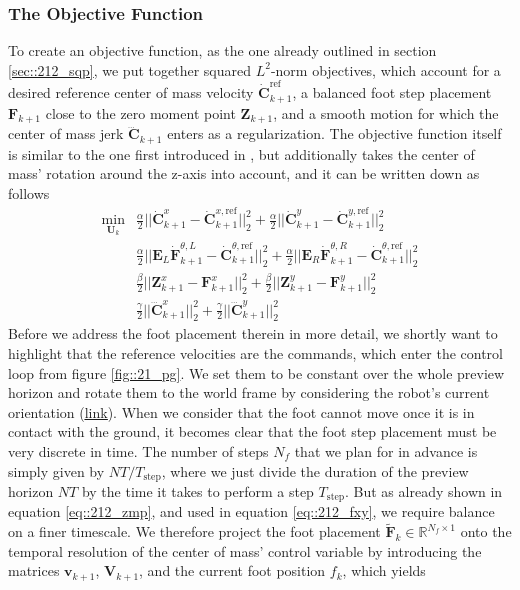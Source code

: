 \subsubsection{The Objective Function}
To create an objective function, as the one already outlined in section \ref{sec::212_sqp}, we put together squared $L^2$-norm objectives, which account for a desired reference center of mass velocity $\dot{\bm{C}}_{k+1}^\text{ref}$, a balanced foot step placement $\textbf{F}_{k+1}$ close to the zero moment point $\bm{Z}_{k+1}$, and a smooth motion for which the center of mass jerk $\dddot{\bm{C}}_{k+1}$ enters as a regularization. The objective function itself is similar to the one first introduced in \cite{herdt2010online}, but additionally takes the center of mass' rotation around the z-axis into account, and it can be written down as follows
\begin{align}
	\min_{\bm{U}_k} &\frac{\alpha}{2}||\dot{\bm{C}}^x_{k+1} - \dot{\bm{C}}_{k+1}^{x,\text{ref}}||_2^2 + \frac{\alpha}{2}||\dot{\bm{C}}^y_{k+1} - \dot{\bm{C}}_{k+1}^{y,\text{ref}}||_2^2 
	\label{eq::212_dcxy}\\
	&\frac{\alpha}{2}||\bm{E}_L\dot{\bm{F}}^{\theta,L}_{k+1} - \dot{\bm{C}}_{k+1}^{\theta,\text{ref}}||_2^2 + 	\frac{\alpha}{2}||\bm{E}_R\dot{\bm{F}}^{\theta,R}_{k+1} - \dot{\bm{C}}_{k+1}^{\theta,\text{ref}}||_2^2 
	\label{eq::212_dftheta} \\
	&\frac{\beta}{2}||\bm{Z}^x_{k+1}-\bm{F}^x_{k+1}||^2_2 + \frac{\beta}{2}||\bm{Z}^y_{k+1}-\bm{F}^y_{k+1}||^2_2 
	\label{eq::212_fxy}\\
	&\frac{\gamma}{2}||\dddot{\bm{C}}_{k+1}^x||^2_2 + \frac{\gamma}{2}||\dddot{\bm{C}}_{k+1}^y||^2_2	
	\label{eq::212_dddcxy}
\end{align}
Before we address the foot placement therein in more detail, we shortly want to highlight that the reference velocities are the commands, which enter the control loop from figure \ref{fig::21_pg}. We set them to be constant over the whole preview horizon and rotate them to the world frame  by considering the robot's current orientation (\href{https://github.com/mhubii/nmpc_pattern_generator/blob/5a213044c927dc6aac9f7e32ce1e5fb472cd67bb/libs/pattern_generator/src/base_generator.cpp#L324}{\underline{link}}). When we consider that the foot cannot move once it is in contact with the ground, it becomes clear that the foot step placement must be very discrete in time. The number of steps $N_f$ that we plan for in advance is simply given by $NT/T_\text{step}$, where we just divide the duration of the preview horizon $NT$ by the time it takes to perform a step $T_\text{step}$. But as already shown in equation \ref{eq::212_zmp}, and used in equation \ref{eq::212_fxy}, we require balance on a finer timescale. We therefore project the foot placement $\tilde{\bm{F}}_k\in\mathbb{R}^{N_f\times1}$ onto the temporal resolution of the center of mass' control variable by introducing the matrices $\bm{v}_{k+1}$, $\bm{V}_{k+1}$, and the current foot position $f_k$, which yields

